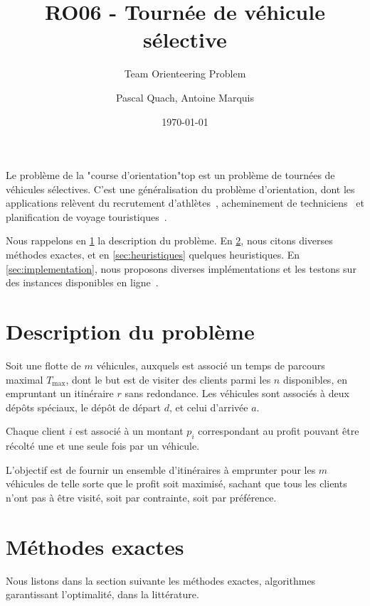 \documentclass[a4paper]{scrartcl}
\title{RO06 - Tournée de véhicule sélective}
\subtitle{Team Orienteering Problem}
\author{Pascal Quach, Antoine Marquis}
\date{\today}
\begin{document}
\maketitle

Le problème de la "course d'orientation"\textemdash \gls{top} \textemdash est
un problème de tournées de véhicules sélectives. C'est une généralisation du
problème d'orientation, dont les applications relèvent du recrutement
d'athlètes~\cite{chao.etal_feb1996}, acheminement de
techniciens~\cite{bouly.etal_mar2008,tang.miller-hooks_jun2005} et
planification de voyage
touristiques~\cite{vansteenwegen.etal_feb2011,vansteenwegen.etal_2009}.

Nous rappelons en \cref{sec:top-description} la description du problème. En
\cref{sec:méthodes-exactes}, nous citons diverses méthodes exactes, et en
\cref{sec:heuristiques} quelques heuristiques. En \cref{sec:implementation},
nous proposons diverses implémentations et les testons sur des instances
disponibles en ligne~\parencite{cib_test_instances,chao_1993,chao.etal_feb1996,tsiligirides_sep1984}.

\section{Description du problème}%
\label{sec:top-description}

Soit une flotte de $m$ véhicules, auxquels est associé un temps de parcours
maximal $T_{\max}$, dont le but est de visiter des clients parmi les $n$
disponibles, en empruntant un itinéraire $r$ sans redondance. Les véhicules
sont associés à deux dépôts spéciaux, le dépôt de départ $d$, et celui
d'arrivée $a$.

Chaque client $i$ est associé à un montant $p_i$ correspondant au profit
pouvant être récolté une et une seule fois par un véhicule.

L'objectif est de fournir un ensemble d'itinéraires à emprunter pour les $m$
véhicules de telle sorte que le profit soit maximisé, sachant que tous les
clients n'ont pas à être visité, soit par contrainte, soit par préférence.

\section{Méthodes exactes}%
\label{sec:méthodes-exactes}

Nous listons dans la section suivante les méthodes exactes, algorithmes
garantissant l'optimalité, dans la littérature. 
\end{document}
